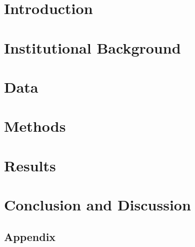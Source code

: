 \documentclass[12pt]{article}%
\begin{document}

 \FloatBarrier
\section{Introduction} \label{sec:intro}

\section{Institutional Background} \label{sec:background}

\section{Data} \label{sec:data}
 
\section{Methods} \label{sec:methods}

\section{Results} \label{sec:results}

\section{Conclusion and Discussion} \label{sec:conclusion}

\FloatBarrier
\newpage
\begin{singlespace}

{}
\end{singlespace}
\FloatBarrier
\newpage
\appendix
\begin{Large}
\section{Appendix}
\end{Large}

\setcounter{table}{0}
\renewcommand{\thetable}{A\arabic{table}}

\begin{appendices}
\end{appendices}
\end{document}
